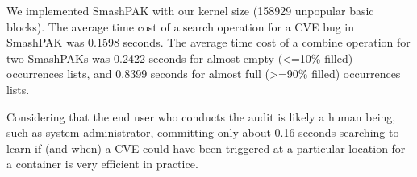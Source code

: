 We implemented SmashPAK with our kernel size (158929 unpopular basic blocks). 
The average time cost of a search operation for a CVE bug in SmashPAK was 0.1598 seconds. 
The average time cost of a combine operation for two SmashPAKs was 0.2422 seconds for almost empty (<=10\% filled) occurrences lists, 
and 0.8399 seconds for almost full (>=90\% filled) occurrences lists. 

Considering that the end user who conducts the audit is likely a human being, such as system administrator, 
committing only about 0.16 seconds searching to learn if (and when) a CVE  could have been triggered at a particular location for a container is very efficient in practice.